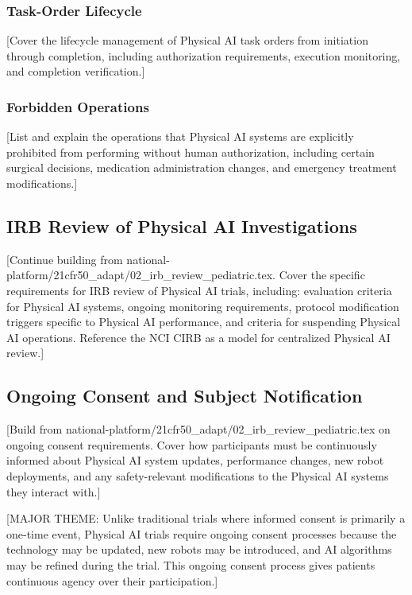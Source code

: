 \subsubsection{Task-Order Lifecycle}
[Cover the lifecycle management of Physical AI task orders from initiation
through completion, including authorization requirements, execution monitoring,
and completion verification.]

\subsubsection{Forbidden Operations}
[List and explain the operations that Physical AI systems are explicitly
prohibited from performing without human authorization, including certain
surgical decisions, medication administration changes, and emergency
treatment modifications.]

\subsection{IRB Review of Physical AI Investigations}
\label{subsec:cfr50-irb}

[Continue building from national-platform/21cfr50\_adapt/02\_irb\_review\_pediatric.tex.
Cover the specific requirements for IRB review of Physical AI trials, including:
evaluation criteria for Physical AI systems, ongoing monitoring requirements,
protocol modification triggers specific to Physical AI performance, and
criteria for suspending Physical AI operations. Reference the NCI CIRB
\cite{nci-cirb} as a model for centralized Physical AI review.]

\subsection{Ongoing Consent and Subject Notification}
\label{subsec:cfr50-ongoing}

[Build from national-platform/21cfr50\_adapt/02\_irb\_review\_pediatric.tex on
ongoing consent requirements. Cover how participants must be continuously
informed about Physical AI system updates, performance changes, new robot
deployments, and any safety-relevant modifications to the Physical AI systems
they interact with.]

[MAJOR THEME: Unlike traditional trials where informed consent is primarily a
one-time event, Physical AI trials require ongoing consent processes because
the technology may be updated, new robots may be introduced, and AI algorithms
may be refined during the trial. This ongoing consent process gives patients
continuous agency over their participation.]

